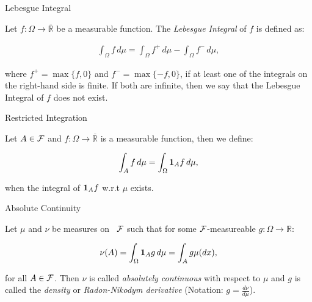 \begin{definition}{}{Lebesgue Integral}

     Let $f: \Omega \to \overline{\mathbb{R}}$ be a measurable function. The \emph{Lebesgue Integral} of $f$ is defined as:

        \begin{align*}
            \int_{\Omega} f \,d\mu = \int_{\Omega} f^+ \,d\mu - \int_{\Omega} f^- \,d\mu,
        \end{align*}

    where $f^+ = \max\{f, 0\}$ and $f^-=\max\{-f, 0\}$, if at least one of the integrals on the right-hand side is finite. If both are infinite, then we say that the Lebesgue Integral of $f$ does not exist.

\end{definition}

\begin{definition}{}{Restricted Integration}

    Let $A \in \mathcal{F}$ and $f: \Omega \to \overline{\mathbb{R}}$ is a measurable function, then we define:

        \begin{align*}
            \int_A f \, d\mu = \int_{\Omega} \mathbf{1}_{A} f \, d\mu,
        \end{align*}

    when the integral of $\mathbf{1}_{A} f$ w.r.t $\mu$ exists.

\end{definition}

\begin{definition}{3.7}{Absolute Continuity}

    Let $\mu$ and $\nu$ be measures on \SigmaAlgebra\ $\mathcal{F}$ such that for some $\mathcal{F}$-measureable $g: \Omega \to \mathbb{R}$:

        \begin{align*}
            \nu(A) = \int_{\Omega} \mathbf{1}_{A} g \, d\mu = \int_{A} g \mu(dx),
        \end{align*}

    for all $A \in \mathcal{F}$. Then $\nu$ is called \emph{absolutely continuous} with respect to $\mu$ and $g$ is called the \emph{density} or \emph{Radon-Nikodym derivative} (Notation: $g = \frac{d\nu}{d\mu}$).

\end{definition}


